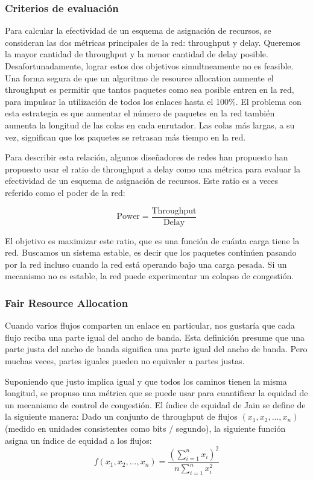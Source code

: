 \subsubsection{Criterios de evaluación}
Para calcular la efectividad de un esquema de asignación de recursos, se consideran las dos métricas principales de la red: throughput y delay. Queremos la mayor cantidad de throughput y la menor cantidad de delay posible. Desafortunadamente, lograr estos dos objetivos simultneamente no es feasible. Una forma segura de que un algoritmo de resource allocation aumente el throughput es permitir que tantos paquetes como sea posible entren en la red, para impulsar la utilización de todos los enlaces hasta el 100\%. El problema con esta estrategia es que aumentar el número de paquetes en la red también aumenta la longitud de las colas en cada enrutador. Las colas más largas, a su vez, significan que los paquetes se retrasan más tiempo en la red.

Para describir esta relación, algunos diseñadores de redes han propuesto han propuesto usar el ratio de throughput a delay como una métrica para evaluar la efectividad de un esquema de asignación de recursos. Este ratio es a veces referido como el poder de la red:

\begin{equation}
  \text{Power} = \frac{\text{Throughput}}{\text{Delay}} 
\end{equation}

El objetivo es maximizar este ratio, que es una función de cuánta carga tiene la red. Buscamos un sistema estable, es decir que los paquetes continúen pasando por la red incluso cuando la red está operando bajo una carga pesada. Si un mecanismo no es estable, la red puede experimentar un colapso de congestión.

\subsubsection*{Fair Resource Allocation}
Cuando varios flujos comparten un enlace en particular, nos gustaría que cada flujo reciba una parte igual del ancho de banda. Esta definición presume que una parte justa del ancho de banda significa una parte igual del ancho de banda. Pero muchas veces, partes iguales pueden no equivaler a partes justas.

Suponiendo que justo implica igual y que todos los caminos tienen la misma longitud, se propuso una métrica que se puede usar para cuantificar la equidad de un mecanismo de control de congestión. El índice de equidad de Jain se define de la siguiente manera: Dado un conjunto de throughput de flujos \((x_1, x_2, ..., x_n)\) (medido en unidades consistentes como bits / segundo), la siguiente función asigna un índice de equidad a los flujos:
\[
  f(x_1, x_2, ..., x_n) = \frac{(\sum_{i=1}^{n} x_i)^2}{n \sum_{i=1}^{n} x_i^2}
\]

